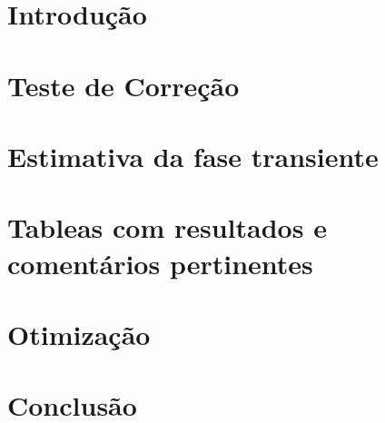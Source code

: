 \documentclass[a4paper,10pt]{article}
\begin{document}
\pagebreak

\tableofcontents
\pagebreak

\section{Introdução}

\pagebreak

\section{Teste de Correção}

\pagebreak

\section{Estimativa da fase transiente}

\pagebreak

\section{Tableas com resultados e comentários pertinentes}

\pagebreak

\section{Otimização}

\pagebreak

\section{Conclusão}

\pagebreak
\end{document}
